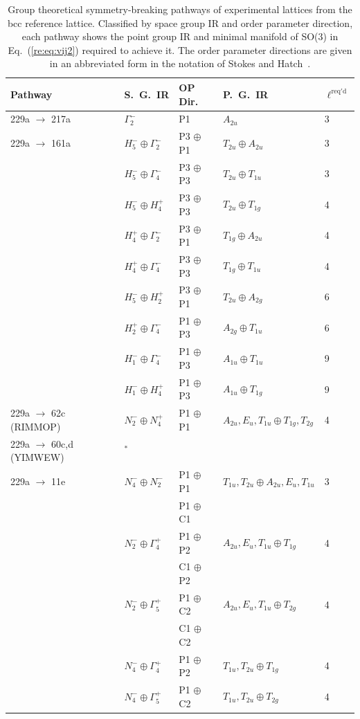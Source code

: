 \documentclass[preprint]{iucr}              %
\begin{document}
\begin{table}
\caption{Group theoretical symmetry-breaking pathways of experimental lattices from the
bcc reference lattice. Classified by space group IR and order
parameter direction, each pathway shows the point group IR and
minimal manifold of SO(3) in Eq.~(\ref{re:eq:vij2}) required to
achieve it.  The order parameter directions are given in an abbreviated form in the
notation of Stokes and
Hatch~\cite{Stokes02a}.}\label{pathwaysBCC} \footnotesize
\begin{tabular}{lllll}\hline
Pathway & S.~G.~IR & OP Dir. & P.~G.~IR & $\ell^{\mathrm{req'd}}$  \\
\hline
229a $\rightarrow$ 217a & $\Gamma_2^-$ & P1 & $A_{2u}$ & 3 \\

229a $\rightarrow$ 161a & $H_5^- \oplus \Gamma_2^-$ & P3 $\oplus$ P1 & $T_{2u} \oplus
A_{2u}$ & 3 \\
& $H_5^- \oplus \Gamma_4^-$ & P3 $\oplus$ P3 & $T_{2u} \oplus
T_{1u}$ &3 \\
& $H_5^- \oplus H_4^+$ & P3 $\oplus$ P3 & $T_{2u} \oplus T_{1g}$
& 4 \\
& $H_4^+ \oplus \Gamma_2^-$ & P3 $\oplus$ P1 & $T_{1g} \oplus A_{2u}$ & 4 \\
& $H_4^+ \oplus \Gamma_4^-$ & P3 $\oplus$ P3 & $T_{1g} \oplus T_{1u}$ & 4\\
& $H_5^- \oplus H_2^+$ & P3 $\oplus$ P1 & $T_{2u} \oplus A_{2g}$
& 6\\
& $H_2^+ \oplus \Gamma_4^-$ & P1 $\oplus$ P3 & $A_{2g} \oplus T_{1u}$ & 6 \\
& $H_1^- \oplus \Gamma_4^-$ & P1 $\oplus$ P3 & $A_{1u} \oplus
T_{1u}$ & 9 \\
& $H_1^- \oplus H_4^+$ & P1 $\oplus$ P3 & $A_{1u} \oplus T_{1g}$
& 9\\

229a $\rightarrow$ 62c (RIMMOP) & $N_2^- \oplus N_4^+$ & P1
$\oplus$ P1 & $A_{2u},E_u,T_{1u} \oplus T_{1g},T_{2g}$ & 4 \\

229a $\rightarrow$ 60c,d (YIMWEW) & $^*$\\

229a $\rightarrow$ 11e & $N_4^- \oplus N_2^-$ & P1 $\oplus$ P1 & $T_{1u},T_{2u} \oplus
A_{2u},E_u,T_{1u}$ & 3\\
&  & P1 $\oplus$ C1  \\
& $N_2^- \oplus \Gamma_4^+$ & P1
$\oplus$ P2 & $A_{2u},E_u,T_{1u} \oplus T_{1g}$ & 4\\
&  & C1 $\oplus$ P2 \\
& $N_2^- \oplus \Gamma_5^+$ & P1 $\oplus$ C2 & $A_{2u},E_u,T_{1u}
\oplus T_{2g}$ & 4 \\
& & C1 $\oplus$ C2 \\
& $N_4^- \oplus \Gamma_4^+$ & P1 $\oplus$ P2 & $T_{1u},T_{2u}
\oplus T_{1g}$ & 4 \\
& $N_4^- \oplus \Gamma_5^+$ & P1 $\oplus$ C2 & $T_{1u},T_{2u}
\oplus T_{2g}$ & 4 \\


\end{tabular}
\end{table}
\end{document}
